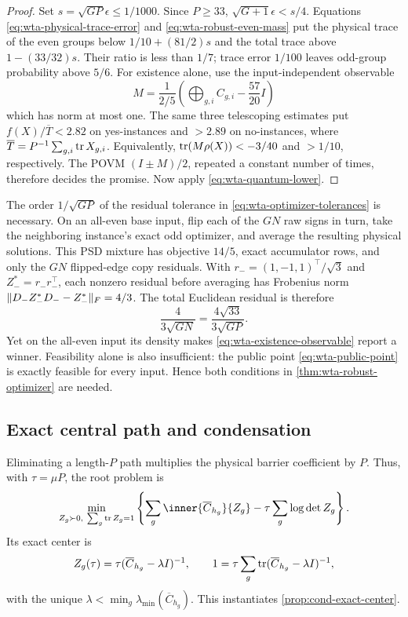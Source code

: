 \begin{proof}
Set $s=\sqrt{GP}\epsilon\le1/1000$.  Since $P\ge33$,
$\sqrt{G+1}\epsilon<s/4$.  Equations
\eqref{eq:wta-physical-trace-error} and
\eqref{eq:wta-robust-even-mass} put the physical trace of the even groups
below
$1/10+(81/2)s$ and the total trace above $1-(33/32)s$.  Their ratio is less
than $1/7$; trace error $1/100$ leaves odd-group probability above $5/6$.
For existence alone, use the input-independent observable
\begin{equation}
 M=\frac1{2/5}\left(\bigoplus_{g,i}C_{g,i}-\frac{57}{20}I\right)
 \label{eq:wta-existence-observable}
\end{equation}
which has norm at most one.  The same three telescoping estimates put
$f(X)/\overline T<2.82$ on yes-instances and $>2.89$ on no-instances,
where $\overline T=P^{-1}\sum_{g,i}\operatorname{tr} X_{g,i}$.  Equivalently,
$\operatorname{tr}(M\rho(X))<-3/40$ and $>1/10$, respectively.
The POVM $(I\pm M)/2$, repeated a constant number of times, therefore
decides the promise.  Now apply \eqref{eq:wta-quantum-lower}.
\end{proof}

The order $1/\sqrt{GP}$ of the residual tolerance in
\eqref{eq:wta-optimizer-tolerances} is necessary.  On an all-even base input,
flip each of the $GN$ raw signs in turn, take the neighboring instance's
exact odd optimizer, and average the resulting physical solutions.  This
PSD mixture has objective $14/5$, exact accumulator rows, and only the $GN$
flipped-edge copy residuals.  With
$r_-=(1,-1,1)^\top/\sqrt3$ and $Z_-^*=r_-r_-^\top$, each nonzero residual before
averaging has Frobenius norm
$\lVert D_-Z_-^*D_--Z_-^*\rVert_F=4/3$.  The total Euclidean residual is therefore
\begin{equation}
 \frac4{3\sqrt{GN}}=\frac{4\sqrt{33}}{3\sqrt{GP}}.
 \label{eq:wta-residual-sharpness}
\end{equation}
Yet on the all-even input its density makes
\eqref{eq:wta-existence-observable} report a winner.  Feasibility alone is
also insufficient: the public point \eqref{eq:wta-public-point} is exactly
feasible for every input.  Hence both conditions in
\cref{thm:wta-robust-optimizer} are needed.

\subsection{Exact central path and condensation}
\label{sec:wta-central-path}

Eliminating a length-$P$ path multiplies the physical barrier coefficient by
$P$.  Thus, with $\tau=\mu P$, the root problem is
\begin{equation}
 \min_{Z_g\succ0,\ \sum_g\tr Z_g=1}
 \left\{\sum_g\inner{\overline C_{h_g}}{Z_g}
                    -\tau\sum_g\log\det Z_g\right\}.
 \label{eq:wta-root-center-problem}
\end{equation}
Its exact center is
\begin{equation}
 Z_g(\tau)=\tau(\overline C_{h_g}-\lambda I)^{-1},
 \qquad
 1=\tau\sum_g\operatorname{tr}(\overline C_{h_g}-\lambda I)^{-1},
 \label{eq:wta-exact-center}
\end{equation}
with the unique $\lambda<\min_g\lambda_{\min}(\overline C_{h_g})$.
This instantiates \cref{prop:cond-exact-center}.

